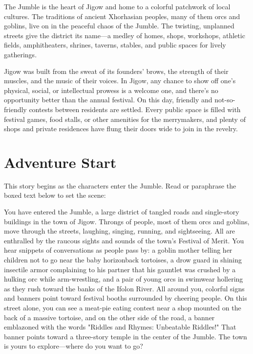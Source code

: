 \documentclass[letterpaper, 11pt, bg=full, twocolumn]{dndbook}
\begin{document}
The Jumble is the heart of Jigow and home to a colorful patchwork of local cultures. The traditions of ancient Xhorhasian peoples, many of them orcs and goblins, live on in the peaceful chaos of the Jumble. The twisting, unplanned streets give the district its name---a medley of homes, shops, workshops, athletic fields, amphitheaters, shrines, taverns, stables, and public spaces for lively gatherings.

Jigow was built from the sweat of its founders' brows, the strength of their muscles, and the music of their voices. In Jigow, any chance to show off one's physical, social, or intellectual prowess is a welcome one, and there's no opportunity better than the annual festival. On this day, friendly and not-so-friendly contests between residents are settled. Every public space is filled with festival games, food stalls, or other amenities for the merrymakers, and plenty of shops and private residences have flung their doors wide to join in the revelry.
\section{Adventure Start}

This story begins as the characters enter the Jumble. Read or paraphrase the boxed text below to set the scene:

\begin{DndReadAloud}
You have entered the Jumble, a large district of tangled roads and single-story buildings in the town of Jigow. Throngs of people, most of them orcs and goblins, move through the streets, laughing, singing, running, and sightseeing. All are enthralled by the raucous sights and sounds of the town's Festival of Merit.
You hear snippets of conversations as people pass by: a goblin mother telling her children not to go near the baby horizonback tortoises, a drow guard in shining insectile armor complaining to his partner that his gauntlet was crushed by a hulking orc while arm-wrestling, and a pair of young orcs in swimwear hollering as they rush toward the banks of the Ifolon River.
All around you, colorful signs and banners point toward festival booths surrounded by cheering people. On this street alone, you can see a meat-pie eating contest near a shop mounted on the back of a massive tortoise, and on the other side of the road, a banner emblazoned with the words "Riddles and Rhymes: Unbeatable Riddles!" That banner points toward a three-story temple in the center of the Jumble. The town is yours to explore---where do you want to go?
\end{DndReadAloud}
\end{document}
